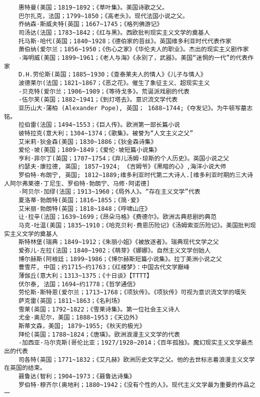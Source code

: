 \documentclass[UTF8]{../RepresentationUniverse}
\begin{document}
\begin{lstlisting}
    惠特曼(美国；1819~1892；《草叶集》。美国诗歌之父。
    巴尔扎克，法国；1799~1850；《高老头》。现代法国小说之父。
    乔纳森·斯威夫特(英国；1667~1745；《格列佛游记》
    司汤达(法国；1783~1842；《红与黑》。西欧批判现实主义文学的奠基人
    托马斯·哈代(英国；1840~1928；《德伯家的苔丝》。英国维多利亚时代代表作家
    萧伯纳(爱尔兰；1856~1950；《伤心之家》《华伦夫人的职业》。杰出的现实主义剧作家
    -海明威(美国；1899~1961；《老人与海》《永别了，武器》。美国“迷惘的一代”的代表作家
    D.H.劳伦斯(英国；1885~1930；《查泰莱夫人的情人》《儿子与情人》
    波德莱尔(法国；1821~1867；《恶之花》。催生了象征主义、超现实主义
    -贝克特(爱尔兰；1906~1989；《等待戈多》。荒诞派戏剧的代表
    -伍尔芙(英国；1882~1941；《到灯塔去》。意识流文学代表
    亚历山大·蒲柏 (Alexander Pope), 英国； 1688~1744;《夺发记》。为牛顿写墓志铭。
    拉伯雷(法国；1494~1553；《巨人传》。欧洲第一部长篇小说
    彼特拉克(意大利；1304~1374；《歌集》。被誉为“人文主义之父”
    艾米莉·狄金森(美国；1830~1886；《狄金森诗集》
    爱伦·坡(美国；1809~1849；《爱伦·坡短篇小说集》
    亨利·菲尔丁(英国；1707~1754；《弃儿汤姆·琼斯的个人历史》。英国小说之父
    约瑟夫·康拉德, 英国; 1857~1924; 《吉姆爷》《黑暗的心》,海洋小说大师
    罗伯特·布朗宁, 英国; 1812~1889;维多利亚时代第二大诗人.[维多利亚时期的三大诗人阿尔弗莱德·丁尼生、罗伯特·勃朗宁、马修·阿诺德]
    -阿贝尔·加缪(法国；1913~1960；《局外人》。“存在主义文学”代表
    夏洛蒂·勃朗特(英国；1816~1855；《简·爱》
    艾米丽·勃朗特(英国；1818~1848；《呼啸山庄》
    让·拉辛(法国；1639~1699；《昂朵马格》《费德尔》。欧洲古典悲剧的典范
    马克·吐温(美国；1835~1910；《哈克贝利·费恩历险记》《汤姆索亚历险记》。美国批判现实主义文学的奠基人
    斯特林堡(瑞典；1849~1912；《朱丽小姐》《被放逐者》。瑞典现代文学之父
    爱弥儿·左拉(法国；1840~1902；《萌芽》《娜娜》。自然主义文学创始人
    博尔赫斯(阿根廷；1899~1986；《博尔赫斯短篇小说集》。拉丁美洲小说之父
    曹雪芹, 中国；约1715~约1763；《红楼梦》：中国古代文学巅峰
    薄伽丘(意大利；1313~1375；《十日谈》【TTTT】
    伏尔泰, 法国；1694~约1778；《哲学通信》
    劳伦斯·斯特恩(爱尔兰；1713~1768；《项狄传》。《项狄传》可视为意识流文学的嚆矢
    萨克雷(英国；1811~1863；《名利场》
    雪莱(英国；1792~1822；《雪莱诗集》。第一位社会主义诗人
    尤金·奥尼尔，美国；1888~1953；《天边外》
    斯蒂文森，美国; 1879~1955;《秋天的极光》
    拜伦(英国；1788~1824；《唐璜》。欧洲浪漫主义文学的代表
    -加西亚·马尔克斯(哥伦比亚；1927/1928~2014；《百年孤独》。魔幻现实主义文学最杰出的代表
    司各特(英国；1771~1832；《艾凡赫》欧洲历史文学之父。他的去世标志着浪漫主义文学在英国的结束。
    聂鲁达(智利；1904~1973；《聂鲁达诗集》
    罗伯特·穆齐尔(奥地利；1880~1942；《没有个性的人》。现代主义文学最为重要的作品之一

\end{lstlisting}
\end{document}
